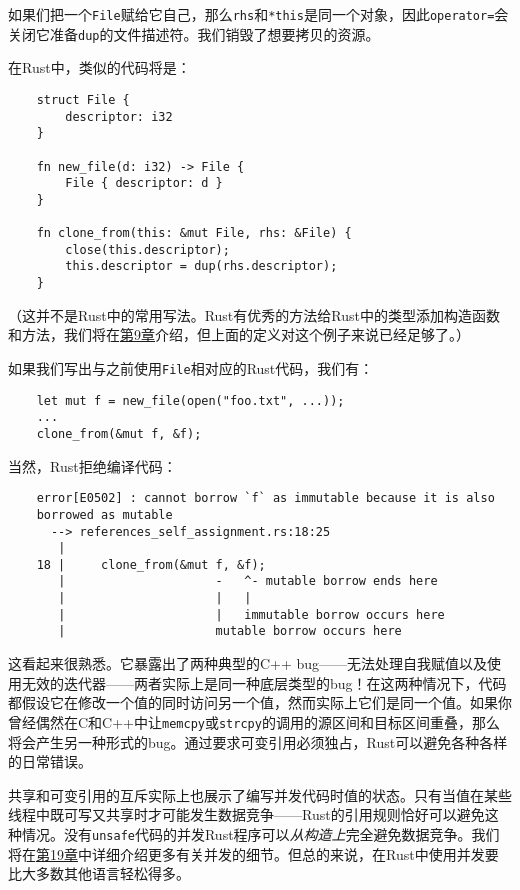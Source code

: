 如果们把一个\texttt{File}赋给它自己，那么\texttt{rhs}和\texttt{*this}是同一个对象，因此\texttt{operator=}会关闭它准备\texttt{dup}的文件描述符。我们销毁了想要拷贝的资源。

在Rust中，类似的代码将是：
\begin{verbatim}
    struct File {
        descriptor: i32
    }

    fn new_file(d: i32) -> File {
        File { descriptor: d }
    }

    fn clone_from(this: &mut File, rhs: &File) {
        close(this.descriptor);
        this.descriptor = dup(rhs.descriptor);
    }
\end{verbatim}
（这并不是Rust中的常用写法。Rust有优秀的方法给Rust中的类型添加构造函数和方法，我们将在\hyperref[ch09]{第9章}介绍，但上面的定义对这个例子来说已经足够了。）

如果我们写出与之前使用\texttt{File}相对应的Rust代码，我们有：
\begin{verbatim}
    let mut f = new_file(open("foo.txt", ...));
    ...
    clone_from(&mut f, &f);
\end{verbatim}

当然，Rust拒绝编译代码：
\begin{verbatim}
    error[E0502] : cannot borrow `f` as immutable because it is also
    borrowed as mutable
      --> references_self_assignment.rs:18:25
       |
    18 |     clone_from(&mut f, &f);
       |                     -   ^- mutable borrow ends here
       |                     |   |
       |                     |   immutable borrow occurs here
       |                     mutable borrow occurs here
\end{verbatim}

这看起来很熟悉。它暴露出了两种典型的C++ bug——无法处理自我赋值以及使用无效的迭代器——两者实际上是同一种底层类型的bug！在这两种情况下，代码都假设它在修改一个值的同时访问另一个值，然而实际上它们是同一个值。如果你曾经偶然在C和C++中让\texttt{memcpy}或\texttt{strcpy}的调用的源区间和目标区间重叠，那么将会产生另一种形式的bug。通过要求可变引用必须独占，Rust可以避免各种各样的日常错误。

共享和可变引用的互斥实际上也展示了编写并发代码时值的状态。只有当值在某些线程中既可写又共享时才可能发生数据竞争——Rust的引用规则恰好可以避免这种情况。没有\texttt{unsafe}代码的并发Rust程序可以\emph{从构造上}完全避免数据竞争。我们将在\hyperref[ch19]{第19章}中详细介绍更多有关并发的细节。但总的来说，在Rust中使用并发要比大多数其他语言轻松得多。

\clearpage

